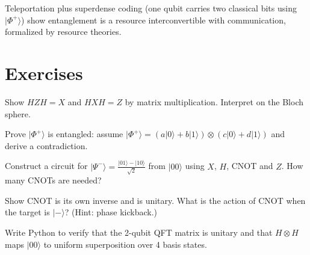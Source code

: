 \begin{remark}
Teleportation plus superdense coding (one qubit carries two classical bits using $\lvert\Phi^+\rangle$) show entanglement is a resource interconvertible with communication, formalized by resource theories.
\end{remark}

\section{Exercises}
\begin{exercise}
Show $HZH=X$ and $HXH=Z$ by matrix multiplication. Interpret on the Bloch sphere.
\end{exercise}
\begin{exercise}
Prove $\lvert\Phi^+\rangle$ is entangled: assume $\lvert\Phi^+\rangle=(a\lvert0\rangle+b\lvert1\rangle)\otimes(c\lvert0\rangle+d\lvert1\rangle)$ and derive a contradiction.
\end{exercise}
\begin{exercise}
Construct a circuit for $\lvert\Psi^-\rangle=\tfrac{\lvert01\rangle-\lvert10\rangle}{\sqrt2}$ from $\lvert00\rangle$ using $X$, $H$, CNOT and $Z$. How many CNOTs are needed?
\end{exercise}
\begin{exercise}
Show CNOT is its own inverse and is unitary. What is the action of CNOT when the target is $\lvert-\rangle$? (Hint: phase kickback.)
\end{exercise}
\begin{exercise}
Write Python to verify that the 2-qubit QFT matrix is unitary and that $H\otimes H$ maps $\lvert00\rangle$ to uniform superposition over 4 basis states.
\end{exercise}
